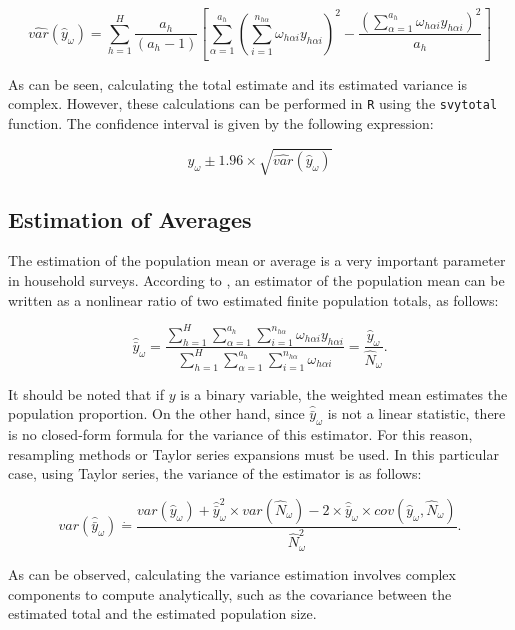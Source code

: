\documentclass[
  12pt,
]{book}
\begin{document}
\[
\widehat{var}\left(\hat{y}_{\omega}\right) = \sum_{h=1}^{H}\frac{a_{h}}{\left(a_{h}-1\right)}\left[\sum_{\alpha=1}^{a_{h}}\left(\sum_{i=1}^{n_{h\alpha}}\omega_{h\alpha i}y_{h\alpha i}\right)^{2}-\frac{\left({ \sum_{\alpha=1}^{a_{h}}}\omega_{h\alpha i}y_{h\alpha i}\right)^{2}}{a_{h}}\right]
\]

As can be seen, calculating the total estimate and its estimated variance is complex. However, these calculations can be performed in \texttt{R} using the \texttt{svytotal} function. The confidence interval is given by the following expression:

\[
\hat{y}_{\omega} \pm 1.96 \times \sqrt{\widehat{var}\left(\hat{y}_{\omega}\right)}
\]

\hypertarget{estimation-of-averages}{%
\subsection{Estimation of Averages}\label{estimation-of-averages}}

The estimation of the population mean or average is a very important parameter in household surveys. According to \citet{Gutierrez_2016}, an estimator of the population mean can be written as a nonlinear ratio of two estimated finite population totals, as follows:

\[
\hat{\bar{y}}_{\omega} = \frac{\sum_{h=1}^{H}\sum_{\alpha=1}^{a_{h}}\sum_{i=1}^{n_{h\alpha}}\omega_{h\alpha i}y_{h\alpha i}}{\sum_{h=1}^{H}\sum_{\alpha=1}^{a_{h}}\sum_{i=1}^{n_{h\alpha}}\omega_{h\alpha i}} = \frac{\hat{y}_{\omega}}{\hat{N}_{\omega}}.
\]

It should be noted that if \(y\) is a binary variable, the weighted mean estimates the population proportion. On the other hand, since \(\hat{\bar{y}}_{\omega}\) is not a linear statistic, there is no closed-form formula for the variance of this estimator. For this reason, resampling methods or Taylor series expansions must be used. In this particular case, using Taylor series, the variance of the estimator is as follows:

\[
var\left(\hat{\bar{y}}_{\omega}\right) \dot{=} \frac{var\left(\hat{y}_{\omega}\right)+\hat{\bar{y}}_{\omega}^{2}\times var\left(\hat{N}_{\omega}\right)-2\times\hat{\bar{y}}_{\omega}\times cov\left(\hat{y}_{\omega},\hat{N}_{\omega}\right)}{\hat{N}_{\omega}^{2}}.
\]

As can be observed, calculating the variance estimation involves complex components to compute analytically, such as the covariance between the estimated total and the estimated population size.
\end{document}
